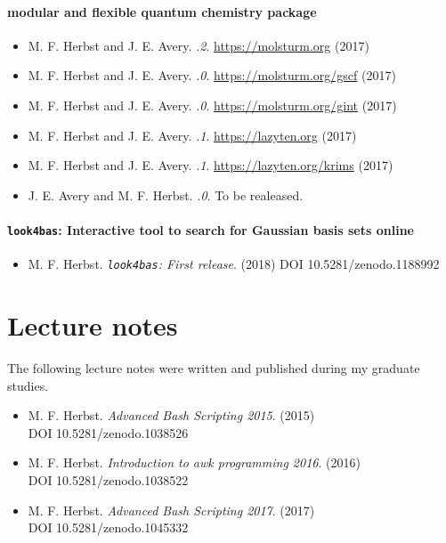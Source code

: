 \paragraph*{\molsturm modular and flexible quantum chemistry package}
\begin{itemize}
	\item M. F. Herbst and J. E. Avery.
		\textit{.2}. \url{https://molsturm.org} (2017)
	\item M. F. Herbst and J. E. Avery.
		\textit{.0}. \url{https://molsturm.org/gscf} (2017)
	\item M. F. Herbst and J. E. Avery.
		\textit{.0}. \url{https://molsturm.org/gint} (2017)
	\item M. F. Herbst and J. E. Avery.
		\textit{.1}. \url{https://lazyten.org} (2017)
	\item M. F. Herbst and J. E. Avery.
		\textit{.1}. \url{https://lazyten.org/krims} (2017)
	\item J. E. Avery and M. F. Herbst.
		\textit{.0}. To be realeased.
\end{itemize}

\pagebreak
\paragraph*{\texttt{look4bas}: Interactive tool to search for Gaussian basis sets online}
\begin{itemize}
	\item M. F. Herbst. \textit{\texttt{look4bas}: First release}. (2018) DOI \mbox{10.5281/zenodo.1188992}
\end{itemize}

\section*{Lecture notes}
{}
The following lecture notes were written and published during my graduate studies.
\begin{itemize}
	\item M. F. Herbst. \textit{Advanced Bash Scripting 2015}. (2015) \\
		DOI \mbox{10.5281/zenodo.1038526}
	\item M. F. Herbst. \textit{Introduction to awk programming 2016}. (2016) \\
		DOI \mbox{10.5281/zenodo.1038522}
	\item M. F. Herbst. \textit{Advanced Bash Scripting 2017}. (2017) \\
		DOI \mbox{10.5281/zenodo.1045332}
\end{itemize}


